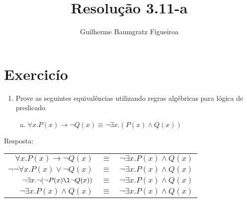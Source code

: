 \documentclass[aspectratio=43]{beamer}
\title[\sc{Resolu\c c\~ao}]{Resolu\c c\~ao 3.11-a}
\author[Guilherme Baumgratz Figueiroa]{Guilherme Baumgratz Figueiroa}
\institute[UFOP]{Universidade Federal de Ouro Preto} %
\date{}
\begin{document}
	
\begin{frame}
	\titlepage
\end{frame}

\section{Exercic\'io}

\begin{frame}%
	\begin{enumerate}[1.]
		\item Prove as seguintes equival\^encias utilizando regras alg\'ebricas para l\'ogica de predicado

	\begin{enumerate}[a)]
		
		\item $\forall x.P(x)\to\neg Q(x) \equiv \neg\exists x.(P(x)\land Q(x))$ \\
		
	\end{enumerate}
	
	\end{enumerate}
	Resposta:
	\\
	\centering
	\pause
	
	\begin{tabular}{rcl}
		$\forall x. P(x)\to\neg Q(x)$ & $\equiv$ & $\neg\exists x.P(x)\land Q(x)$\\
		\pause
		$\neg \neg \forall x.P(x)\lor\neg Q(x)$  & $\equiv$ & $\neg\exists x.P(x)\land Q(x)$ \\
		\pause
		$\neg\exists x.\neg (\neg P(x)\l\neg Q(x))$  & $\equiv$ & $\neg\exists x.P(x)\land Q(x)$ \\
		\pause
		$\neg\exists x. P(x) \land Q(x)$  & $\equiv$ & $\neg\exists x.P(x)\land Q(x)$ 
	\end{tabular}
	
	
\end{frame}
\end{document}
